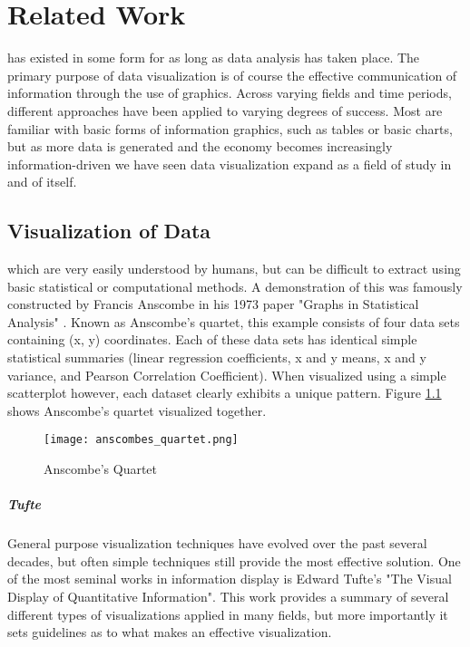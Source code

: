 \chapter{Related Work}
\label{sec:state_of_the_art}
 has existed in some form for as long as data analysis has taken place. The primary purpose of data visualization is of course the effective communication of information through the use of graphics. Across varying fields and time periods, different approaches have been applied to varying degrees of success. Most are familiar with basic forms of information graphics, such as tables or basic charts, but as more data is generated and the economy becomes increasingly information-driven we have seen data visualization expand as a field of study in and of itself. 
 
\section{Visualization of Data}
\label{sec:dataviz}
 which are very easily understood by humans, but can be difficult to extract using basic statistical or computational methods. A demonstration of this was famously constructed by Francis Anscombe in his 1973 paper "Graphs in Statistical Analysis" \cite{Anscombe1973}. Known as Anscombe's quartet, this example consists of four data sets containing (x, y) coordinates. Each of these data sets has identical simple statistical summaries (linear regression coefficients, x and y means, x and y variance, and Pearson Correlation Coefficient). When visualized using a simple scatterplot however, each dataset clearly exhibits a unique pattern. Figure \ref{fig:anscombe} shows Anscombe's quartet visualized together. 

\begin{figure}
	\centering
	\label{fig:anscombe}
	\texttt{[image: anscombes\_quartet.png]}
	\caption{Anscombe's Quartet \cite{Shoresh2012}}
\end{figure}

\paragraph{Tufte}
General purpose visualization techniques have evolved over the past several decades, but often simple techniques still provide the most effective solution. One of the most seminal works in information display is Edward Tufte's "The Visual Display of Quantitative Information"\cite{Tufle1983}. This work provides a summary of several different types of visualizations applied in many fields, but more importantly it sets guidelines as to what makes an effective visualization.

